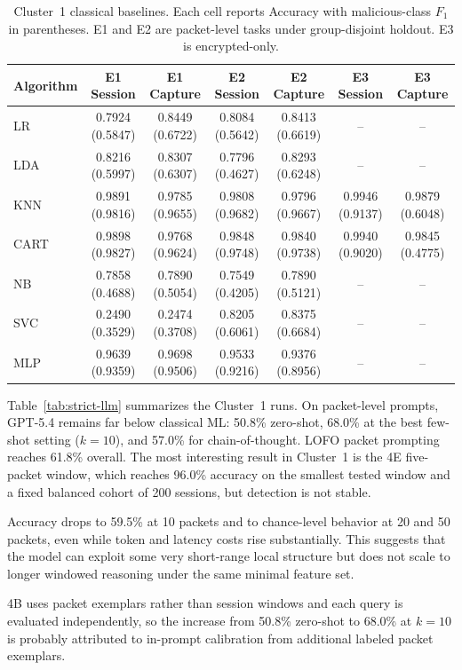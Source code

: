 \documentclass[letterpaper,twocolumn,10pt]{article}
\begin{document}
\begin{table}[t]
\centering
\caption{Cluster~1 classical baselines. Each cell reports Accuracy with malicious-class $F_1$ in parentheses. E1 and E2 are packet-level tasks under group-disjoint holdout. E3 is encrypted-only.}
\label{tab:strict-classical}
\footnotesize
\begin{tabular}{lcccccc}
\toprule
Algorithm & E1 Session & E1 Capture & E2 Session & E2 Capture & E3 Session & E3 Capture \\
\midrule
LR   & 0.7924 (0.5847) & 0.8449 (0.6722) & 0.8084 (0.5642) & 0.8413 (0.6619) & -- & -- \\
LDA  & 0.8216 (0.5997) & 0.8307 (0.6307) & 0.7796 (0.4627) & 0.8293 (0.6248) & -- & -- \\
KNN  & 0.9891 (0.9816) & 0.9785 (0.9655) & 0.9808 (0.9682) & 0.9796 (0.9667) & 0.9946 (0.9137) & 0.9879 (0.6048) \\
CART & 0.9898 (0.9827) & 0.9768 (0.9624) & 0.9848 (0.9748) & 0.9840 (0.9738) & 0.9940 (0.9020) & 0.9845 (0.4775) \\
NB   & 0.7858 (0.4688) & 0.7890 (0.5054) & 0.7549 (0.4205) & 0.7890 (0.5121) & -- & -- \\
SVC  & 0.2490 (0.3529) & 0.2474 (0.3708) & 0.8205 (0.6061) & 0.8375 (0.6684) & -- & -- \\
MLP  & 0.9639 (0.9359) & 0.9698 (0.9506) & 0.9533 (0.9216) & 0.9376 (0.8956) & -- & -- \\
\bottomrule
\end{tabular}
\end{table}

Table~\ref{tab:strict-llm} summarizes the Cluster~1 runs. On packet-level prompts, GPT-5.4 remains far below classical ML: 50.8\% zero-shot, 68.0\% at the best few-shot setting ($k=10$), and 57.0\% for chain-of-thought. LOFO packet prompting reaches 61.8\% overall. The most interesting result in Cluster~1 is the 4E five-packet window, which reaches 96.0\% accuracy on the smallest tested window and a fixed balanced cohort of 200 sessions, but detection is not stable.

Accuracy drops to 59.5\% at 10 packets and to chance-level behavior at 20 and 50 packets, even while token and latency costs rise substantially. This suggests that the model can exploit some very short-range local structure but does not scale to longer windowed reasoning under the same minimal feature set.

4B uses packet exemplars rather than session windows and each query is evaluated independently, so the increase from 50.8\% zero-shot to 68.0\% at $k=10$ is probably attributed to in-prompt calibration from additional labeled packet exemplars.
\end{document}
